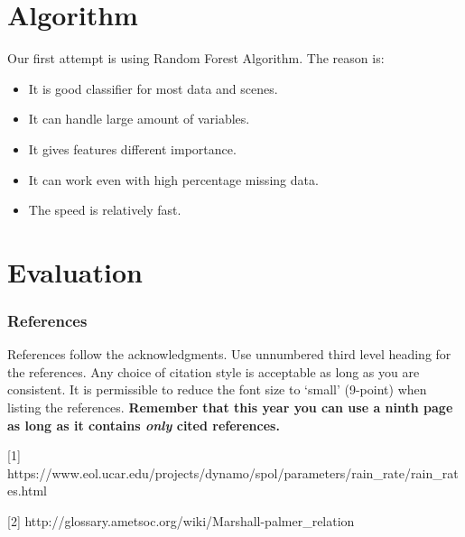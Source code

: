 \documentclass{article} %
\begin{document}
\section{Algorithm}

Our first attempt is using Random Forest Algorithm. The reason is:
\begin{itemize}
\item It is good classifier for most data and scenes.
\item It can handle large amount of variables.
\item It gives features different importance.
\item It can work even with high percentage missing data.
\item The speed is relatively fast.
\end{itemize}

\section{Evaluation}





\subsubsection*{References}

References follow the acknowledgments. Use unnumbered third level heading for
the references. Any choice of citation style is acceptable as long as you are
consistent. It is permissible to reduce the font size to `small' (9-point) 
when listing the references. {\bf Remember that this year you can use
a ninth page as long as it contains \emph{only} cited references.}

\small{
[1] https://www.eol.ucar.edu/projects/dynamo/spol/parameters/rain\_rate/rain\_rates.html

[2] http://glossary.ametsoc.org/wiki/Marshall-palmer\_relation
}
\end{document}
